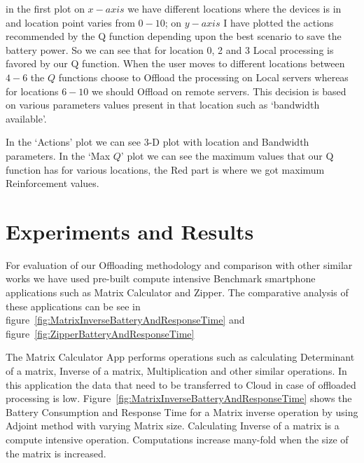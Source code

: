 \documentclass[12pt]{report}
\begin{document}
in the first plot on $x-axis$ we have different locations where the devices is in and location point varies from $0-10$; on $y-axis$ I have plotted the actions recommended by the Q function depending upon the best scenario to save the battery power. So we can see that for location 0, 2 and 3 Local processing is favored by our Q function. When the user moves to different locations between $4-6$ the $Q$ functions choose to Offload the processing on Local servers whereas for locations $6-10$ we should Offload on remote servers. This decision is based on various parameters values present in that location such as `bandwidth available'. \par
In the `Actions' plot we can see 3-D plot with location and Bandwidth parameters. In the `Max $Q$' plot we can see the maximum values that our Q function has for various locations, the Red part is where we got maximum Reinforcement values. 


\chapter{Experiments and Results} %
\label{chap:ExperimentsAndResults}

For evaluation of our Offloading methodology and comparison with other similar works we have used pre-built compute intensive Benchmark smartphone applications such as Matrix Calculator and Zipper. The comparative analysis of these applications can be see in figure~\ref{fig:MatrixInverseBatteryAndResponseTime} and figure~\ref{fig:ZipperBatteryAndResponseTime}

The Matrix Calculator App performs operations such as calculating Determinant of a matrix, Inverse of a matrix, Multiplication and other similar operations. In this application the data that need to be transferred to Cloud in case of offloaded processing is low.
Figure~\ref{fig:MatrixInverseBatteryAndResponseTime} shows the Battery Consumption and Response Time for a Matrix inverse operation by using Adjoint method with varying Matrix size. Calculating Inverse of a matrix is a compute intensive operation. Computations increase many-fold when the size of the matrix is increased.
\end{document}
